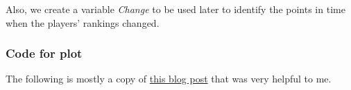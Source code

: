 \documentclass[]{book}
\newenvironment{Shaded}{\begin{snugshade}}{\end{snugshade}}
\newcommand{\DataTypeTok}[1]{\textcolor[rgb]{0.13,0.29,0.53}{#1}}
\newcommand{\DecValTok}[1]{\textcolor[rgb]{0.00,0.00,0.81}{#1}}
\newcommand{\KeywordTok}[1]{\textcolor[rgb]{0.13,0.29,0.53}{\textbf{#1}}}
\newcommand{\NormalTok}[1]{#1}
\newcommand{\OperatorTok}[1]{\textcolor[rgb]{0.81,0.36,0.00}{\textbf{#1}}}
\newcommand{\StringTok}[1]{\textcolor[rgb]{0.31,0.60,0.02}{#1}}
\begin{document}
Also, we create a variable \emph{Change} to be used later to identify the points in time when the players' rankings changed.

\begin{Shaded}
\end{Shaded}

\hypertarget{atpcode}{%
\subsubsection*{Code for plot}\label{atpcode}}

The following is mostly a copy of \href{https://www.r-bloggers.com/bump-chart/}{this blog post} that was very helpful to me.
\end{document}

